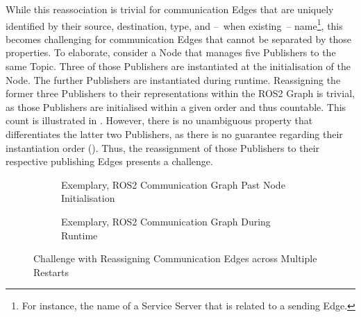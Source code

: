         While this reassociation is trivial for communication Edges that are uniquely identified by their source, destination, type, and --~when existing~-- name\footnote{For instance, the name of a Service Server that is related to a sending Edge.}, this becomes challenging for communication Edges that cannot be separated by those properties.\newline
        To elaborate, consider a Node that manages five Publishers to the same Topic. Three of those Publishers are instantiated at the initialisation of the Node. The further Publishers are instantiated during runtime.\newline
        Reassigning the former three Publishers to their representations within the ROS2 Graph is trivial, as those Publishers are initialised within a given order and thus countable. This count is illustrated in . However, there is no unambiguous property that differentiates the latter two Publishers, as there is no guarantee regarding their instantiation order (). Thus, the reassignment of those Publishers to their respective publishing Edges presents a challenge.
        \begin{figure}[h]
            \centering
            \begin{subfigure}[h]{.48\textwidth}
                \centering
                
                \caption[Exemplary, ROS2 Communication Graph Past Node Initialisation]{Exemplary, ROS2 Communication Graph Past Node Initialisation \circledLegend} \label{fig:tikz:pubProblem1}
            \end{subfigure}
            \begin{subfigure}[h]{.48\textwidth}
                \centering
                
                \caption[Exemplary, ROS2 Communication Graph During Runtime]{Exemplary, ROS2 Communication Graph During Runtime \circledLegend} \label{fig:tikz:pubProblem2}
            \end{subfigure}
            \caption[Challenge with Reassigning Communication Edges across Multiple Restarts]{Challenge with Reassigning Communication Edges across Multiple Restarts} \label{fig:tikz:pubProblem}
        \end{figure}


